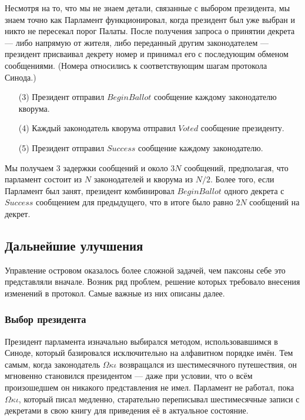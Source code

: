 \documentclass[12pt, a4paper]{article} %
\begin{document}
Несмотря на то, что мы не знаем детали, связанные с выбором президента, мы знаем точно как Парламент функционировал, когда президент был уже выбран и никто не пересекал порог Палаты. После  получения запроса о принятии декрета --- либо напрямую от жителя, либо переданный другим законодателем --- президент присваивал декрету номер и принимал его с последующим обменом сообщениями. (Номера относились к соответствующим шагам протокола Синода.) 
\begin{itemize}
    \item[(3)] Президент отправил $BeginBallot$ сообщение каждому законодателю кворума.
    \item[(4)] Каждый законодатель кворума отправил $Voted$ сообщение президенту.
    \item[(5)] Президент отправил $Success$ сообщение каждому законодателю.
\end{itemize}

Мы получаем 3 задержки сообщений и около $3N$ сообщений, предполагая, что парламент состоит из $N$ законодателей и кворума из $N/2$. Более того, если Парламент был занят, президент  комбинировал $BeginBallot$ одного декрета с $Success$ сообщением для предыдущего, что в итоге было равно $2N$ сообщений на декрет.

\subsection{Дальнейшие улучшения}\label{sec:dev}

Управление островом оказалось более сложной задачей, чем паксоны себе это представляли вначале. Возник ряд проблем, решение которых требовало внесения изменений в протокол. Самые важные из них описаны далее.

\subsubsection{Выбор президента}

Президент парламента изначально выбирался методом, использовавшимся в Синоде, который базировался исключительно на алфавитном порядке имён. Тем самым, когда законодатель $\Omega\kappa\iota$ возвращался из шестимесячного путешествия, он мгновенно становился президентом --- даже при условии, что о всём произошедшем он никакого представления не имел. Парламент не работал, пока $\Omega\kappa\iota$, который писал медленно, старательно переписывал шестимесячные записи с декретами в свою книгу для приведения её в актуальное состояние.
\end{document}
